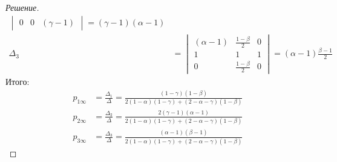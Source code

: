 \documentclass[12pt,a4paper]{article}
\begin{document}
\begin{proof}[Решение]
\begin{align*}
\begin{vmatrix}
		0 & 0 & (\gamma - 1)
		\end{vmatrix} = (\gamma - 1)(\alpha - 1) \\
		\Delta_3 &=  \begin{vmatrix}
		(\alpha - 1) & \frac{1-\beta}{2} & 0 \\
		1 & 1 & 1 \\
		0 & \frac{1-\beta}{2} & 0
		\end{vmatrix} = (\alpha - 1)\frac{\beta-1}{2} 
	\end{align*}
	Итого:
	\begin{align*}
		p_{1\infty} &= \frac{\Delta_1}{\Delta} = \frac{(1-\gamma)(1-\beta)}{2(1-\alpha)(1-\gamma) + (2 - \alpha - \gamma)(1-\beta)} \\
		p_{2\infty} &= \frac{\Delta_2}{\Delta} = \frac{2(\gamma-1)(\alpha-1)}{2(1-\alpha)(1-\gamma) + (2 - \alpha - \gamma)(1-\beta)} \\
		p_{3\infty} &= \frac{\Delta_3}{\Delta} = \frac{(\alpha-1)(\beta-1)}{2(1-\alpha)(1-\gamma) + (2 - \alpha - \gamma)(1-\beta)}
	\end{align*}

\end{proof}
\end{document}

